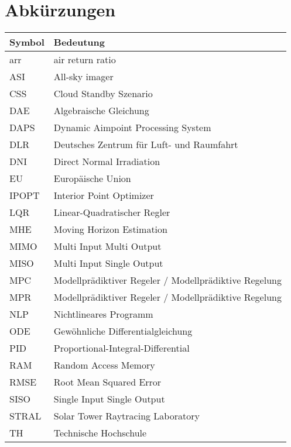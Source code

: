 \section*{Abkürzungen}
\begin{table}[ht!]
    \centering
    \begin{tabular}{m{}m{}}
        \rowcolor{white}
        Symbol & Bedeutung                                             \\
        \midrule
        arr    & air return ratio                                      \\
        ASI    & All-sky imager                                        \\
        CSS    & Cloud Standby Szenario                                \\
        DAE    & Algebraische Gleichung                                \\
        DAPS   & Dynamic Aimpoint Processing System                    \\
        DLR    & Deutsches Zentrum für Luft- und Raumfahrt             \\
        DNI    & Direct Normal Irradiation                             \\
        EU     & Europäische Union                                     \\
        IPOPT  & Interior Point Optimizer                              \\
        LQR    & Linear-Quadratischer Regler                           \\
        MHE    & Moving Horizon Estimation                             \\
        MIMO   & Multi Input Multi Output                              \\
        MISO   & Multi Input Single Output                             \\
        MPC    & Modellprädiktiver Regeler / Modellprädiktive Regelung \\
        MPR    & Modellprädiktiver Regeler / Modellprädiktive Regelung \\
        NLP    & Nichtlineares Programm                                \\
        ODE    & Gewöhnliche Differentialgleichung                     \\
        PID    & Proportional-Integral-Differential                    \\
        RAM    & Random Access Memory                                  \\
        RMSE   & Root Mean Squared Error                               \\
        SISO   & Single Input Single Output                            \\
        STRAL  & Solar Tower Raytracing Laboratory                     \\
        TH     & Technische Hochschule                                 \\
    \end{tabular}
\end{table}
\clearpage
\newpage

